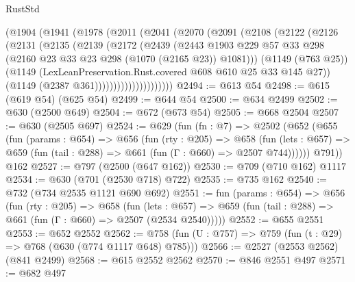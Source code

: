 \begin{lexlean}{RustStd}
\begin{coremodule}
              (@1904
                (@1941
                  (@1978
                    (@2011
                      (@2041
                        (@2070
                          (@2091
                            (@2108
                              (@2122
                                (@2126
                                  (@2131
                                    (@2135
                                      (@2139
                                        (@2172
                                          (@2439
                                            (@2443
                                              @1903
                                              @229
                                              @57
                                              @33
                                              @298
                                              (@2160 @23 @33 @23 @298 (@1070 (@2165 @23)) @1081)))
                                          (@1149 (@763 @25))
                                          (@1149
                                            (LexLeanPreservation.Rust.covered
                                              @608
                                              @610
                                              @25
                                              @33
                                              @145
                                              @27))
                                          (@1149 (@2387 @361)))))))))))))))))))))
@2494 := @613 @54
@2498 := @615 (@619 @54) (@625 @54)
@2499 := @644 @54
@2500 := @634 @2499
@2502 := @630 (@2500 @649)
@2504 := @672 (@673 @54)
@2505 := @668 @2504
@2507 := @630 (@2505 @697)
@2524 := @629
    (fun (fn : @7) =>
    @2502
      (@652
        (@655
          (fun (params : @654) =>
          @656
            (fun (rty : @205) =>
            @658
              (fun (lets : @657) =>
              @659 (fun (tail : @288) => @661 (fun (Γ : @660) => @2507 @744))))))
        @791))
    @162
@2527 := @797 (@2500 (@647 @162))
@2530 := @709 (@710 @162) @1117
@2534 := @630 (@701 (@2530 @718) @722)
@2535 := @735 @162
@2540 := @732 (@734 @2535 @1121 @690 @692)
@2551 := fun (params : @654) =>
  @656
    (fun (rty : @205) =>
    @658
      (fun (lets : @657) =>
      @659 (fun (tail : @288) => @661 (fun (Γ : @660) => @2507 (@2534 @2540)))))
@2552 := @655 @2551
@2553 := @652 @2552
@2562 := @758 (fun (U : @757) => @759 (fun (t : @29) => @768 (@630 (@774 @1117 @648) @785)))
@2566 := @2527 (@2553 @2562) (@841 @2499)
@2568 := @615 @2552 @2562
@2570 := @846 @2551 @497
@2571 := @682 @497

\end{coremodule}
\end{lexlean}
